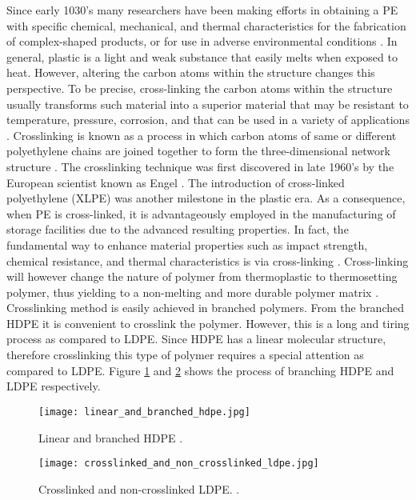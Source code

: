 Since early 1030’s many researchers have been making efforts in obtaining a PE with specific chemical, mechanical, and thermal characteristics for the fabrication of complex-shaped products, or for use in adverse environmental conditions \cite{kurtz2009cross}. In general, plastic is a light and weak substance that easily melts when exposed to heat. However, altering the carbon atoms within the structure changes this perspective. To be precise, cross-linking the carbon atoms within the structure usually transforms such material into a superior material that may be resistant to temperature, pressure, corrosion, and that can be used in a variety of applications \cite{meola2005cross}. Crosslinking is known as a process in which carbon atoms of same or different polyethylene chains are joined together to form the three-dimensional network structure \cite{kurtz2009cross}.
The crosslinking technique was first discovered in late 1960’s by the European scientist known as Engel \cite{meola2005cross}. The introduction of cross-linked polyethylene (XLPE) was another milestone in the plastic era. As a consequence, when PE is cross-linked, it is advantageously employed in the manufacturing of storage facilities due to the advanced resulting properties. In fact, the fundamental way to enhance material properties such as impact strength, chemical resistance, and thermal characteristics is via cross-linking \cite{andreopoulos1986mechanical}. Cross-linking will however change the nature of polymer from thermoplastic to thermosetting polymer, thus yielding to a non-melting and more durable polymer matrix \cite{clemens2017microstructure}. Crosslinking method is easily achieved in branched polymers. From the branched HDPE it is convenient to crosslink the polymer. However, this is a long and tiring process as compared to LDPE.
Since HDPE has a linear molecular structure, therefore crosslinking this type of polymer requires a special attention as compared to LDPE. Figure \ref{ch3:figure:hdpe} and \ref{ch3:figure:ldpe} shows the process of branching HDPE and LDPE respectively.
 
\begin{figure}[H]
    \centering
    \texttt{[image: linear\_and\_branched\_hdpe.jpg]}
    \caption{Linear and branched HDPE \cite{gabriel1998history}.}
    \label{ch3:figure:hdpe}
\end{figure}

\begin{figure}[H]
    \centering
    \texttt{[image: crosslinked\_and\_non\_crosslinked\_ldpe.jpg]}
    \caption{Crosslinked and non-crosslinked LDPE. \cite{kurtz2009cross}.}
    \label{ch3:figure:ldpe}
\end{figure}

